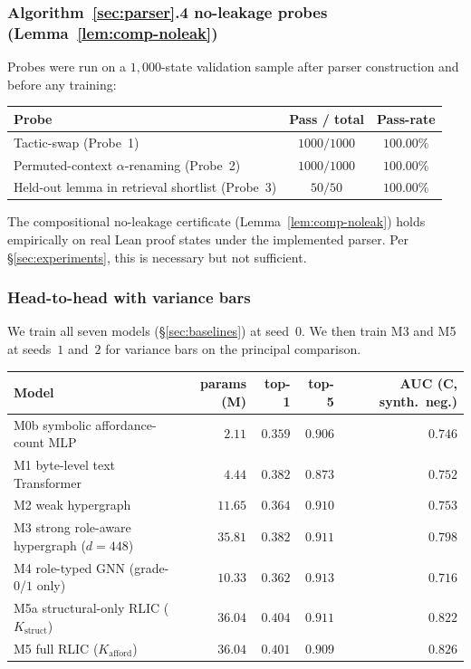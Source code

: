 \documentclass[11pt]{article}
\theoremstyle{definition}
\theoremstyle{plain}
\newcommand{\Kstruct}{K_{\mathrm{struct}}}
\newcommand{\Kafford}{K_{\mathrm{afford}}}
\begin{document}
\subsubsection*{Algorithm~\protect\ref{sec:parser}.4 no-leakage probes (Lemma~\protect\ref{lem:comp-noleak})}

Probes were run on a $1{,}000$-state validation sample after parser
construction and before any training:

\begin{center}
\begin{tabular}{lcc}
\toprule
Probe & Pass / total & Pass-rate \\
\midrule
Tactic-swap (Probe~1) & $1000 / 1000$ & $100.00\%$ \\
Permuted-context $\alpha$-renaming (Probe~2) & $1000 / 1000$ & $100.00\%$ \\
Held-out lemma in retrieval shortlist (Probe~3) & $50 / 50$ & $100.00\%$ \\
\bottomrule
\end{tabular}
\end{center}

\noindent The compositional no-leakage certificate (Lemma~\ref{lem:comp-noleak})
holds empirically on real Lean proof states under the implemented parser.
Per \S\ref{sec:experiments}, this is necessary but not sufficient.

\subsubsection*{Head-to-head with variance bars}

We train all seven models (\S\ref{sec:baselines}) at seed~$0$. We then train
M3 and M5 at seeds~$1$ and~$2$ for variance bars on the principal comparison.

\begin{center}
\small
\begin{tabular}{lrrrr}
\toprule
Model & params (M) & top-1 & top-5 & AUC (C, synth.\ neg.) \\
\midrule
M0b symbolic affordance-count MLP & $2.11$ & $0.359$ & $0.906$ & $0.746$ \\
M1 byte-level text Transformer & $4.44$ & $0.382$ & $0.873$ & $0.752$ \\
M2 weak hypergraph & $11.65$ & $0.364$ & $0.910$ & $0.753$ \\
M3 strong role-aware hypergraph ($d = 448$) & $35.81$ & $0.382$ & $0.911$ & $0.798$ \\
M4 role-typed GNN (grade-$0$/$1$ only) & $10.33$ & $0.362$ & $0.913$ & $0.716$ \\
M5a structural-only RLIC ($\Kstruct$) & $36.04$ & $0.404$ & $0.911$ & $0.822$ \\
M5 full RLIC ($\Kafford$) & $36.04$ & $0.401$ & $0.909$ & $0.826$ \\
\bottomrule
\end{tabular}
\end{center}
\end{document}
